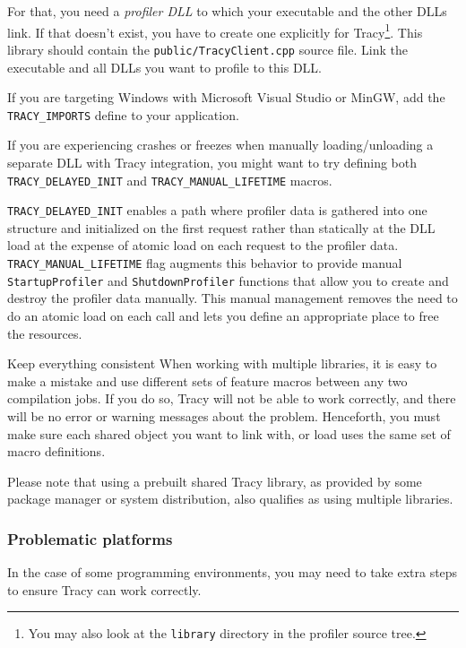 \documentclass[hidelinks,titlepage,a4paper]{article}
\begin{document}
For that, you need a \emph{profiler DLL} to which your executable and the other DLLs link. If that doesn't exist, you have to create one explicitly for Tracy\footnote{You may also look at the \texttt{library} directory in the profiler source tree.}. This library should contain the \texttt{public/TracyClient.cpp} source file. Link the executable and all DLLs you want to profile to this DLL.

If you are targeting Windows with Microsoft Visual Studio or MinGW, add the \texttt{TRACY\_IMPORTS} define to your application.

If you are experiencing crashes or freezes when manually loading/unloading a separate DLL with Tracy integration, you might want to try defining both \texttt{TRACY\_DELAYED\_INIT} and \texttt{TRACY\_MANUAL\_LIFETIME} macros.

\texttt{TRACY\_DELAYED\_INIT} enables a path where profiler data is gathered into one structure and initialized on the first request rather than statically at the DLL load at the expense of atomic load on each request to the profiler data. \texttt{TRACY\_MANUAL\_LIFETIME} flag augments this behavior to provide manual \texttt{StartupProfiler} and \texttt{ShutdownProfiler} functions that allow you to create and destroy the profiler data manually. This manual management removes the need to do an atomic load on each call and lets you define an appropriate place to free the resources.

\begin{bclogo}[
noborder=true,
couleur=black!5,
logo=\bcbombe
]{Keep everything consistent}
When working with multiple libraries, it is easy to make a mistake and use different sets of feature macros between any two compilation jobs. If you do so, Tracy will not be able to work correctly, and there will be no error or warning messages about the problem. Henceforth, you must make sure each shared object you want to link with, or load uses the same set of macro definitions.

Please note that using a prebuilt shared Tracy library, as provided by some package manager or system distribution, also qualifies as using multiple libraries.
\end{bclogo}

\subsubsection{Problematic platforms}

In the case of some programming environments, you may need to take extra steps to ensure Tracy can work correctly.
\end{document}
